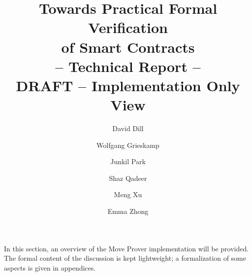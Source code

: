 \documentclass[runningheads]{article}
\begin{document}
\title{Towards Practical Formal Verification \\ of Smart Contracts \\
  \small -- Technical Report -- \\
  \textbf{DRAFT -- Implementation Only View}
}


\author{
  David Dill \and Wolfgang Grieskamp \and Junkil
  Park \and Shaz Qadeer \and Meng Xu \and Emma Zhong
}


\maketitle

\tableofcontents




%
%

\setcounter{section}{2}


In this section, an overview of the Move Prover implementation will be provided.
The formal content of the discussion is kept lightweight; a formalization of some
aspects is given in appendices.















\end{document}
